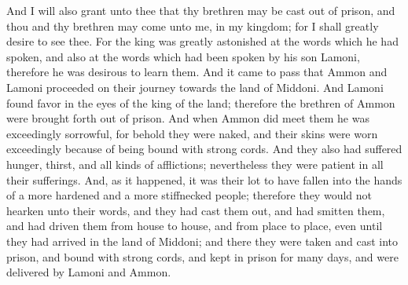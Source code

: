 \bverse \iffalse And I will also grant unto thee that thy brethren may be cast out of prison, and thou and thy brethren may come unto me, in my kingdom; for I shall greatly desire to see thee. For the king was greatly astonished at the words which he had spoken, and also at the words which had been spoken by his son Lamoni, therefore he was desirous to learn them. \fi
And I will also grant unto thee that thy brethren may be cast out of prison, and thou and thy brethren may come unto me, in my kingdom; for I shall greatly desire to see thee. For the king was greatly astonished at the words which he had spoken, and also at the words which had been spoken by his son Lamoni, therefore he was desirous to learn them.
\bverse \iffalse And it came to pass that Ammon and Lamoni proceeded on their journey towards the land of Middoni. And Lamoni found favor in the eyes of the king of the land; therefore the brethren of Ammon were brought forth out of prison. \fi
And it came to pass that Ammon and Lamoni proceeded on their journey towards the land of Middoni. And Lamoni found favor in the eyes of the king of the land; therefore the brethren of Ammon were brought forth out of prison.
\bverse \iffalse And when Ammon did meet them he was exceedingly sorrowful, for behold they were naked, and their skins were worn exceedingly because of being bound with strong cords. And they also had suffered hunger, thirst, and all kinds of afflictions; nevertheless they were patient in all their sufferings. \fi
And when Ammon did meet them he was exceedingly sorrowful, for behold they were naked, and their skins were worn exceedingly because of being bound with strong cords. And they also had suffered hunger, thirst, and all kinds of afflictions; nevertheless they were patient in all their sufferings.
\bverse \iffalse And, as it happened, it was their lot to have fallen into the hands of a more hardened and a more stiffnecked people; therefore they would not hearken unto their words, and they had cast them out, and had smitten them, and had driven them from house to house, and from place to place, even until they had arrived in the land of Middoni; and there they were taken and cast into prison, and bound with strong cords, and kept in prison for many days, and were delivered by Lamoni and Ammon. \fi
And, as it happened, it was their lot to have fallen into the hands of a more hardened and a more stiffnecked people; therefore they would not hearken unto their words, and they had cast them out, and had smitten them, and had driven them from house to house, and from place to place, even until they had arrived in the land of Middoni; and there they were taken and cast into prison, and bound with strong cords, and kept in prison for many days, and were delivered by Lamoni and Ammon.
